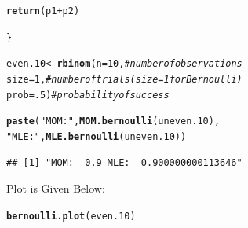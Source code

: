 \documentclass{article}\usepackage[]{graphicx}\usepackage[]{color}
\makeatletter
\newcommand{\hlnum}[1]{\textcolor[rgb]{0.686,0.059,0.569}{#1}}%
\newcommand{\hlstr}[1]{\textcolor[rgb]{0.192,0.494,0.8}{#1}}%
\newcommand{\hlcom}[1]{\textcolor[rgb]{0.678,0.584,0.686}{\textit{#1}}}%
\newcommand{\hlopt}[1]{\textcolor[rgb]{0,0,0}{#1}}%
\newcommand{\hlstd}[1]{\textcolor[rgb]{0.345,0.345,0.345}{#1}}%
\newcommand{\hlkwb}[1]{\textcolor[rgb]{0.69,0.353,0.396}{#1}}%
\newcommand{\hlkwc}[1]{\textcolor[rgb]{0.333,0.667,0.333}{#1}}%
\newcommand{\hlkwd}[1]{\textcolor[rgb]{0.737,0.353,0.396}{\textbf{#1}}}%
\newenvironment{kframe}{%
 \def\at@end@of@kframe{}%
 \ifinner\ifhmode%
  \def\at@end@of@kframe{\end{minipage}}%
  \begin{minipage}{\columnwidth}%
 \fi\fi%
 \def\FrameCommand##1{\hskip\@totalleftmargin \hskip-\fboxsep
 \colorbox{shadecolor}{##1}\hskip-\fboxsep
     \hskip-\linewidth \hskip-\@totalleftmargin \hskip\columnwidth}%
 \MakeFramed {\advance\hsize-\width
   \@totalleftmargin\z@ \linewidth\hsize
   \@setminipage}}%
 {\par\unskip\endMakeFramed%
 \at@end@of@kframe}
\newenvironment{knitrout}{}{} %
\makeatother
\begin{document}
\begin{enumerate}
\begin{enumerate}
\begin{knitrout}
\begin{kframe}
\begin{alltt}
  \hlkwd{return}\hlstd{(p1}\hlopt{+}\hlstd{p2)}

\hlstd{\}}
\end{alltt}
\end{kframe}
\end{knitrout}

\begin{knitrout}
\color{fgcolor}\begin{kframe}
\begin{alltt}
\hlstd{even.10} \hlkwb{<-} \hlkwd{rbinom}\hlstd{(}\hlkwc{n}\hlstd{=}\hlnum{10}\hlstd{,}        \hlcom{#number of observations}
                    \hlkwc{size}\hlstd{=}\hlnum{1}\hlstd{,}        \hlcom{#number of trials (size=1 for Bernoulli)}
                    \hlkwc{prob}\hlstd{=}\hlnum{.5}\hlstd{)}       \hlcom{#probability of success}

\hlkwd{paste}\hlstd{(}\hlstr{"MOM: "}\hlstd{,} \hlkwd{MOM.bernoulli}\hlstd{(uneven.10),}
      \hlstr{"MLE: "}\hlstd{,} \hlkwd{MLE.bernoulli}\hlstd{(uneven.10))}
\end{alltt}
\begin{verbatim}
## [1] "MOM:  0.9 MLE:  0.900000000113646"
\end{verbatim}
\end{kframe}
\end{knitrout}
Plot is Given Below:
\begin{knitrout}
\color{fgcolor}\begin{kframe}
\begin{alltt}
\hlkwd{bernoulli.plot}\hlstd{(even.10)}
\end{alltt}
\end{kframe}
\end{knitrout}


\end{enumerate}
\end{enumerate}
\end{document}
